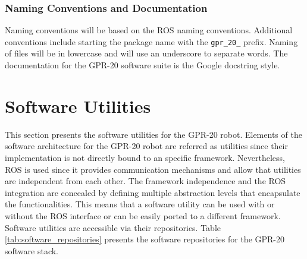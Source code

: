 \documentclass{article}
\begin{document}
\subsubsection{Naming Conventions and Documentation}
Naming conventions will be based on the ROS naming conventions. Additional conventions include starting the package name with the \texttt{gpr\_20\_} prefix. Naming of files will be in lowercase and will use an underscore to separate words. The documentation for the GPR-20 software suite is the Google docstring style.

\newpage
\section{Software Utilities}
This section presents the software utilities for the GPR-20 robot. Elements of the software architecture for the GPR-20 robot are referred as utilities since their implementation is not directly bound to an specific framework. Nevertheless, ROS is used since it provides communication mechanisms and allow that utilities are independent from each other. The framework independence and the ROS integration are concealed by defining multiple abstraction levels that encapsulate the functionalities. This means that a software utility can be used with or without the ROS interface or can be easily ported to a different framework. Software utilities are accessible via their repositories. Table \ref{tab:software_repositories} presents the software repositories for the GPR-20 software stack.
\end{document}
